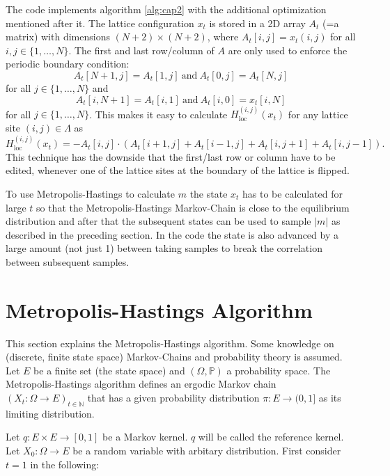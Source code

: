 \documentclass[a4paper]{article}
\begin{document}
The code implements algorithm \ref{alg:cap2} with the additional optimization mentioned after it.
The lattice configuration $x_t$ is stored in a 2D array $A_t$ (=a matrix) with dimensions $(N+2) \times (N+2)$,
where $A_t[i,j] = x_t(i,j) $ for all $i,j \in \{1, \dots, N\}$.
The first and last row/column of $A$ are only used to enforce the periodic boundary condition:
\begin{equation*}
    A_t[N+1,j]= A_t[1,j] \ \text{and} \ A_t[0,j] =A_t[N,j]
\end{equation*}
for all $j \in \{1, \dots, N\}$ and
\begin{equation}
    A_t[i,N+1]= A_t[i,1] \ \text{and} \ A_t[i,0]= x_t[i,N]
\end{equation}
for all $j \in \{1, \dots, N\}$.
This makes it easy
to calculate $H_{\mathrm{loc}}^{(i,j)}(x_t)$ for any lattice site $(i,j)\in \Lambda$ as
\begin{equation}
    H_{\mathrm{loc}}^{(i,j)}(x_t) = - A_t[i,j] \cdot  (A_t[i+1,j]+ A_t[i-1,j] + A_t[i,j+1]+ A_t[i,j-1]).
\end{equation}
This technique has the downside that the first/last row or column have to be edited,
 whenever one of the lattice sites at the boundary of the lattice is flipped.

 To use Metropolis-Hastings to calculate $m$ the state $x_t$ has to be calculated for large $t$ so that
 the Metropolis-Hastings Markov-Chain is
close to the equilibrium distribution and after that the subsequent states can be used to sample $|m|$
as described in the preceding section.
In the code the state is also advanced by a large amount (not just 1)
between taking samples to break the correlation between subsequent samples.

\section{Metropolis-Hastings Algorithm}
\label{sec:3}

This section explains the Metropolis-Hastings algorithm.
Some knowledge on (discrete, finite state space) Markov-Chains and probability theory is assumed.
Let $E$ be a finite set (the state space) and $(\Omega, \mathbb{P})$ a probability space.
The Metropolis-Hastings algorithm defines an ergodic Markov chain $(X_t : \Omega \to E)_{t \in \mathbb{N}}$
that has a given
probability distribution $\pi : E\to (0,1]$ as its limiting distribution.

Let $q: E \times E \to [0,1]$ be a Markov kernel.
$q$ will be called the reference kernel.
Let $X_0: \Omega \to E$ be a random variable with arbitary distribution.
First consider $t=1$ in the following:
\end{document}

